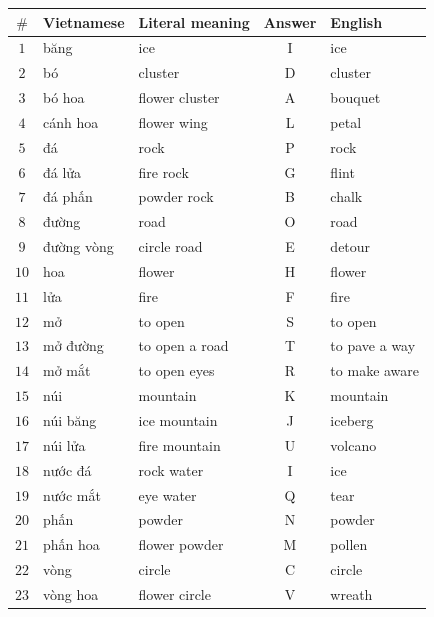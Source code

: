 \begin{center}
	\renewcommand{\arraystretch}{1}
	\setlength{\tabcolsep}{8pt}
	\begin{tabular}{|c|l|l|c|l|}
		\hline
		$\#$ & Vietnamese & Literal meaning & Answer & English       \\ \hline
		$1 $ & băng       & ice             & I      & ice           \\ \hline
		$2 $ & bó         & cluster         & D      & cluster       \\ \hline
		$3 $ & bó hoa     & flower cluster  & A      & bouquet       \\ \hline
		$4 $ & cánh hoa   & flower wing     & L      & petal         \\ \hline
		$5 $ & đá         & rock            & P      & rock          \\ \hline
		$6 $ & đá lửa     & fire rock       & G      & flint         \\ \hline
		$7 $ & đá phấn    & powder rock     & B      & chalk         \\ \hline
		$8 $ & đường      & road            & O      & road          \\ \hline
		$9 $ & đường vòng & circle road     & E      & detour        \\ \hline
		$10$ & hoa        & flower          & H      & flower        \\ \hline
		$11$ & lửa        & fire            & F      & fire          \\ \hline
		$12$ & mở         & to open         & S      & to open       \\ \hline
		$13$ & mở đường   & to open a road  & T      & to pave a way \\ \hline
		$14$ & mở mắt     & to open eyes    & R      & to make aware \\ \hline
		$15$ & núi        & mountain        & K      & mountain      \\ \hline
		$16$ & núi băng   & ice mountain    & J      & iceberg       \\ \hline
		$17$ & núi lửa    & fire mountain   & U      & volcano       \\ \hline
		$18$ & nước đá    & rock water      & I      & ice           \\ \hline
		$19$ & nước mắt   & eye water       & Q      & tear          \\ \hline
		$20$ & phấn       & powder          & N      & powder        \\ \hline
		$21$ & phấn hoa   & flower powder   & M      & pollen        \\ \hline
		$22$ & vòng       & circle          & C      & circle        \\ \hline
		$23$ & vòng hoa   & flower circle   & V      & wreath        \\ \hline
	\end{tabular}
\end{center}
